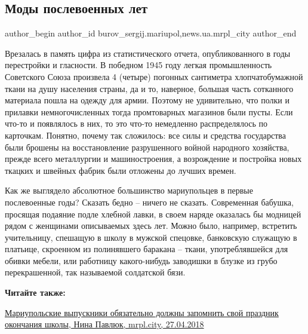  
 
 
 
 
 
\subsection{Моды послевоенных лет}
\label{sec:28_07_2018.stz.news.ua.mrpl_city.1.mody_poslevoennyh_let}
 
\ifcmt
 author_begin
   author_id burov_sergij.mariupol,news.ua.mrpl_city
 author_end
\fi

Врезалась в память цифра из статистического отчета, опубликованного в годы
перестройки и гласности. В победном 1945 году легкая промышленность Советского
Союза произвела 4 (четыре) погонных сантиметра хлопчатобумажной ткани на душу
населения страны, да и то, наверное, большая часть сотканного материала пошла
на одежду для армии. Поэтому не удивительно, что полки и прилавки
немногочисленных тогда промтоварных магазинов были пусты. Если что-то и
появлялось в них, то это что-то немедленно распределялось по карточкам.
Понятно, почему так сложилось: все силы и средства государства были брошены на
восстановление разрушенного войной народного хозяйства, прежде всего
металлургии и машиностроения, а возрождение и постройка новых ткацких и швейных
фабрик были отложены до лучших времен.

Как же выглядело абсолютное большинство мариупольцев в первые послевоенные
годы? Сказать бедно – ничего не сказать. Современная бабушка, просящая подаяние
подле хлебной лавки, в своем наряде оказалась бы модницей рядом с женщинами
описываемых здесь лет. Можно было, например, встретить учительницу, спешащую в
школу в мужской спецовке, банковскую служащую в платьице, скроенном из
полинявшего баракана – ткани, употреблявшейся для обивки мебели, или работницу
какого-нибудь заводишки в блузке из грубо перекрашенной, так называемой
солдатской бязи.

\textbf{Читайте также:} 

\href{https://mrpl.city/blogs/view/mariupolskie-vypuskniki-obyazatelno-dolzhny-zapomnit-svoj-prazdnik-okonchaniya-shkoly}{Мариупольские выпускники обязательно должны запомнить свой праздник окончания школы, Нина Павлюк, mrpl.city, 27.04.2018}

